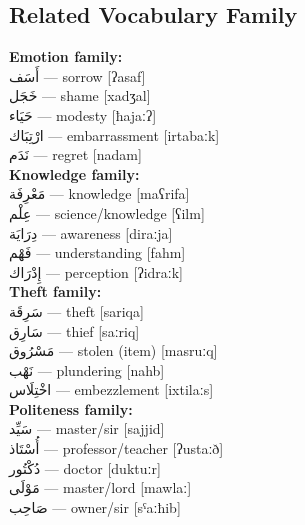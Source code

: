 \documentclass[letterpaper,12pt]{article}
\begin{document}
\subsection{Related Vocabulary Family}
\begin{multicols}{2}

\textbf{Emotion family:}\\
\textarabic{أَسَف} — sorrow [ʔasaf]\\
\textarabic{خَجَل} — shame [xadʒal]\\
\textarabic{حَيَاء} — modesty [ħajaːʔ]\\
\textarabic{ارْتِبَاك} — embarrassment [irtabaːk]\\
\textarabic{نَدَم} — regret [nadam]\\

\textbf{Knowledge family:}\\
\textarabic{مَعْرِفَة} — knowledge [maʕrifa]\\
\textarabic{عِلْم} — science/knowledge [ʕilm]\\
\textarabic{دِرَايَة} — awareness [diraːja]\\
\textarabic{فَهْم} — understanding [fahm]\\
\textarabic{إِدْرَاك} — perception [ʔidraːk]\\

\textbf{Theft family:}\\
\textarabic{سَرِقَة} — theft [sariqa]\\
\textarabic{سَارِق} — thief [saːriq]\\
\textarabic{مَسْرُوق} — stolen (item) [masruːq]\\
\textarabic{نَهْب} — plundering [nahb]\\
\textarabic{اخْتِلَاس} — embezzlement [ixtilaːs]\\

\textbf{Politeness family:}\\
\textarabic{سَيِّد} — master/sir [sajjid]\\
\textarabic{أُسْتَاذ} — professor/teacher [ʔustaːð]\\
\textarabic{دُكْتُور} — doctor [duktuːr]\\
\textarabic{مَوْلَى} — master/lord [mawlaː]\\
\textarabic{صَاحِب} — owner/sir [sˤaːħib]
\end{multicols}
\end{document}
